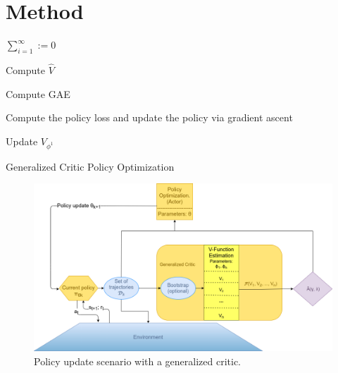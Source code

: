 \section{Method}

\begin{algorithm}[H]
\DontPrintSemicolon
  
  $\sum_{i=1}^{\infty} := 0$


   Compute $\hat{V}$

   Compute GAE

   Compute the policy loss and update the policy via gradient ascent

    {
    	Update $V_{\phi^1}$	
    } 
    
\caption{Generalized Critic Policy Optimization}

\end{algorithm}

\begin{figure}[!htb]
\includegraphics[width=\linewidth]{images/model}
\caption{Policy update scenario with a generalized critic.}
\label{fig:model}
\end{figure}
